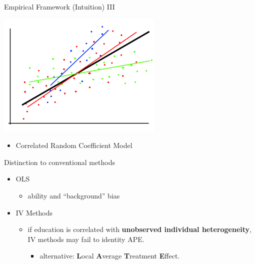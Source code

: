 \documentclass[10pt,ignorenonframetext,]{beamer}
\providecommand{\tightlist}{%
  \setlength{\itemsep}{0pt}\setlength{\parskip}{0pt}}
\begin{document}
\begin{frame}{Empirical Framework (Intuition) III}
\protect\hypertarget{empirical-framework-intuition-iii}{}

\includegraphics[width=3.125in,height=\textheight]{img/rcmodel003.png}

\begin{itemize}
\tightlist
\item
  Correlated Random Coefficient Model
\end{itemize}

\end{frame}

\begin{frame}{Distinction to conventional methods}
\protect\hypertarget{distinction-to-conventional-methods}{}

\begin{itemize}
\tightlist
\item
  OLS

  \begin{itemize}
  \tightlist
  \item
    ability and ``background'' bias
  \end{itemize}
\item
  IV Methods

  \begin{itemize}
  \tightlist
  \item
    if education is correlated with \textbf{unobserved individual
    heterogeneity}, IV methods may fail to identity APE.

    \begin{itemize}
    \tightlist
    \item
      alternative: \textbf{L}ocal \textbf{A}verage \textbf{T}reatment
      \textbf{E}ffect.
    \end{itemize}
  \end{itemize}
\end{itemize}

\end{frame}
\end{document}
